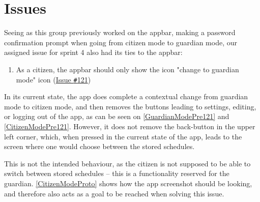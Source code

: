 \section{Issues}
Seeing as this group previously worked on the appbar, making a password confirmation prompt when going from citizen mode to guardian mode, our assigned issue for sprint 4 also had its ties to the appbar:

\begin{enumerate}
  \item As a citizen, the appbar should only show the icon "change to guardian mode" icon (\href{https://github.com/aau-giraf/weekplanner/issues/121}{Issue \texttt{\#}121})
\end{enumerate}

In its current state, the app does complete a contextual change from guardian mode to citizen mode, and then removes the buttons leading to settings, editing, or logging out of the app, as can be seen on \autoref{GuardianModePre121} and \autoref{CitizenModePre121}.
However, it does not remove the back-button in the upper left corner, which, when pressed in the current state of the app, leads to the screen where one would choose between the stored schedules.


This is not the intended behaviour, as the citizen is not supposed to be able to switch between stored schedules -- this is a functionality reserved for the guardian.
\autoref{CitizenModeProto} shows how the app screenshot should be looking, and therefore also acts as a goal to be reached when solving this issue.

